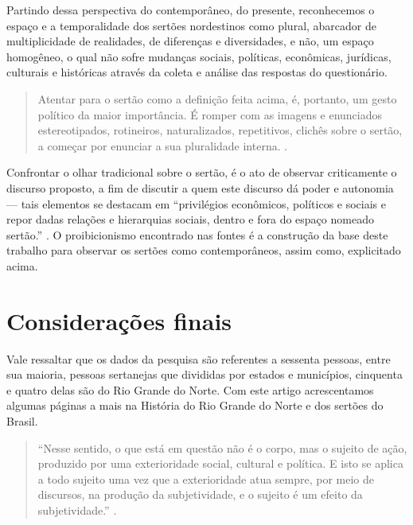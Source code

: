 \begin{refsection}
    Partindo dessa perspectiva do contemporâneo, do presente, reconhecemos o espaço e a temporalidade dos sertões nordestinos como plural, abarcador de multiplicidade de realidades, de diferenças e diversidades, e não, um espaço homogêneo, o qual não sofre mudanças sociais, políticas, econômicas, jurídicas, culturais e históricas através da coleta e análise das respostas do questionário.

    \begin{quotation}
        Atentar para o sertão como a definição feita acima, é, portanto, um gesto político da maior importância. É romper com as imagens e enunciados estereotipados, rotineiros, naturalizados, repetitivos, clichês sobre o sertão, a começar por enunciar a sua pluralidade interna. \cite[p.~43]{AlbuquerqueJr2016VedeSertao}.
    \end{quotation}

    Confrontar o olhar tradicional sobre o sertão, é o ato de observar criticamente o discurso proposto, a fim de discutir a quem este discurso dá poder e autonomia --- tais elementos se destacam em ``privilégios econômicos, políticos e sociais e repor dadas relações e hierarquias sociais, dentro e fora do espaço nomeado sertão.'' \cite[p.~43]{AlbuquerqueJr2016VedeSertao}. O proibicionismo encontrado nas fontes é a construção da base deste trabalho para observar os sertões como contemporâneos, assim como, explicitado acima.

    \section{Considerações finais}

    Vale ressaltar que os dados da pesquisa são referentes a sessenta pessoas, entre sua maioria, pessoas sertanejas que divididas por estados e municípios, cinquenta e quatro delas são do Rio Grande do Norte. Com este artigo acrescentamos algumas páginas a mais na História do Rio Grande do Norte e dos sertões do Brasil.

    \begin{quotation}
        ``Nesse sentido, o que está em questão não é o corpo, mas o sujeito de ação, produzido por uma exterioridade social, cultural e política. E isto se aplica a todo sujeito uma vez que a exterioridade atua sempre, por meio de discursos, na produção da subjetividade, e o sujeito é um efeito da subjetividade.'' \cite[p.~60]{Fernandes2012Discurso}.
    \end{quotation}


\end{refsection}
